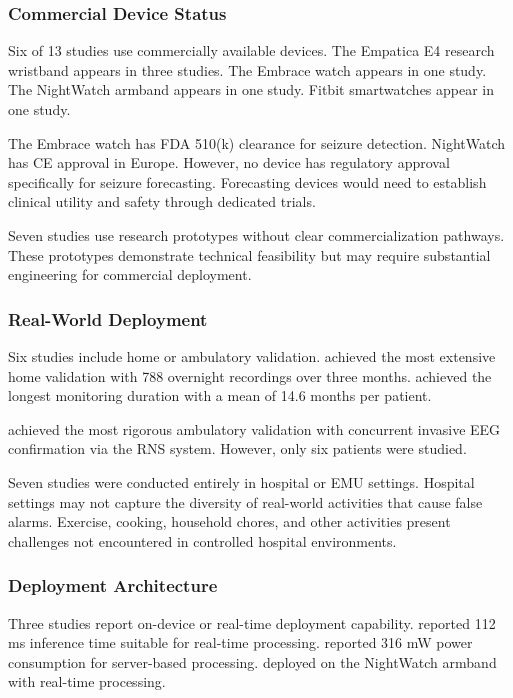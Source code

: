 \subsubsection{Commercial Device Status}

Six of 13 studies use commercially available devices. The Empatica E4 research wristband appears in three studies. The Embrace watch appears in one study. The NightWatch armband appears in one study. Fitbit smartwatches appear in one study.

The Embrace watch has FDA 510(k) clearance for seizure detection. NightWatch has CE approval in Europe. However, no device has regulatory approval specifically for seizure forecasting. Forecasting devices would need to establish clinical utility and safety through dedicated trials.

Seven studies use research prototypes without clear commercialization pathways. These prototypes demonstrate technical feasibility but may require substantial engineering for commercial deployment.

\subsubsection{Real-World Deployment}

Six studies include home or ambulatory validation. \textcite{dongTwoLayerEnsembleMethod2022} achieved the most extensive home validation with 788 overnight recordings over three months. \textcite{stirlingForecastingSeizureLikelihood2021} achieved the longest monitoring duration with a mean of 14.6 months per patient.

\textcite{nasseriAmbulatorySeizureForecasting2021} achieved the most rigorous ambulatory validation with concurrent invasive EEG confirmation via the RNS system. However, only six patients were studied.

Seven studies were conducted entirely in hospital or EMU settings. Hospital settings may not capture the diversity of real-world activities that cause false alarms. Exercise, cooking, household chores, and other activities present challenges not encountered in controlled hospital environments.

\subsubsection{Deployment Architecture}

Three studies report on-device or real-time deployment capability. \textcite{spahrDeepLearningbasedDetection2025} reported 112 ms inference time suitable for real-time processing. \textcite{borujenyDetectionEpilepticSeizure2013} reported 316 mW power consumption for server-based processing. \textcite{dongTwoLayerEnsembleMethod2022} deployed on the NightWatch armband with real-time processing.

